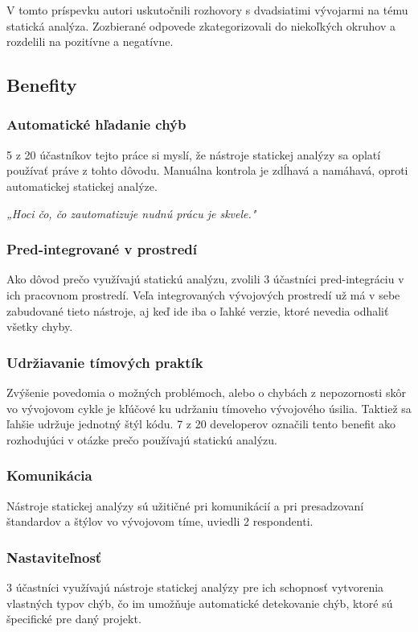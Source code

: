 \documentclass[10pt,twoside,slovak,a4paper]{article}
\begin{document}
V tomto príspevku autori uskutočnili rozhovory s dvadsiatimi vývojarmi na tému statická analýza. Zozbierané odpovede
zkategorizovali do niekoľkých okruhov a rozdelili na pozitívne a negatívne.

\subsection{Benefity} \label{vyuzitie:benefity}
\subsubsection*{Automatické hľadanie chýb}
5 z 20 účastníkov tejto práce si myslí, že nástroje statickej analýzy sa oplatí používať práve z tohto dôvodu.
Manuálna kontrola je zdĺhavá a namáhavá, oproti automatickej statickej analýze.

\emph{„Hoci čo, čo zautomatizuje nudnú prácu je skvele."}

\subsubsection*{Pred-integrované v prostredí}
Ako dôvod prečo využívajú statickú analýzu, zvolili 3 účastníci pred-integráciu v ich pracovnom prostredí. Veľa
integrovaných vývojových prostredí už má v sebe zabudované tieto nástroje, aj keď ide iba o ľahké verzie, ktoré nevedia
odhaliť všetky chyby.

\subsubsection*{Udržiavanie tímových praktík}
Zvýšenie povedomia o možných problémoch, alebo o chybách z nepozornosti skôr vo vývojovom cykle je kľúčové ku udržaniu
tímoveho vývojového úsilia. Taktiež sa ľahšie udržuje jednotný štýl kódu. 7 z 20 developerov označili tento benefit ako
rozhodujúci v otázke prečo používajú statickú analýzu.

\subsubsection*{Komunikácia}
Nástroje statickej analýzy sú užitičné pri komunikácií a pri presadzovaní štandardov a štýlov vo vývojovom tíme,
uviedli 2 respondenti.

\subsubsection*{Nastaviteľnosť}
3 účastníci využívajú nástroje statickej analýzy pre ich schopnosť vytvorenia vlastných typov chýb, čo im umožňuje
automatické detekovanie chýb, ktoré sú špecifické pre daný projekt.
\end{document}
